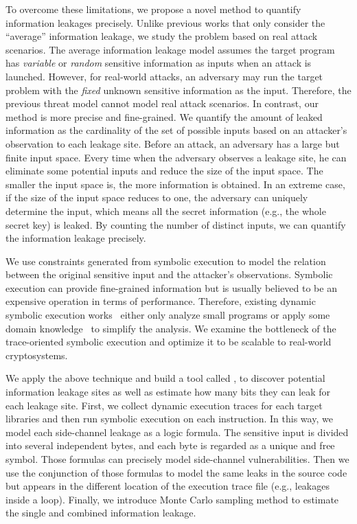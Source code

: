 To overcome these limitations, we propose a novel method to quantify information
leakages precisely. Unlike previous works that only consider the
``average'' information leakage, we study the problem based on real attack
scenarios. The average information leakage model assumes the target program has
\emph{variable} or \emph{random} sensitive information as inputs when an attack is
launched. However, for real-world attacks, an adversary may run the target
problem with the \emph{fixed} unknown sensitive information
as the input. Therefore, the previous threat model cannot model real attack
scenarios. In contrast, our method is more precise and fine-grained. 
We quantify
the amount of leaked information as the cardinality of the set of possible
inputs based on an attacker's observation to each leakage site.
Before an attack, an adversary has a large but finite input space. Every time
when the adversary observes a leakage site, he can eliminate some potential
inputs and reduce the size of the input space. The smaller the input space is,
the more information is obtained. In an extreme case, if the size of the
input space reduces to one, the adversary can uniquely determine the input, 
which means all the secret information (e.g., the whole secret key) is
leaked. By counting the number of distinct inputs, we can quantify the
information leakage precisely.

We use constraints generated from symbolic execution to model the relation 
between the original sensitive input
and the attacker's observations. Symbolic execution can
provide fine-grained information but is usually believed to be an expensive
operation in terms of performance. Therefore, existing dynamic symbolic
execution works~\cite{203878,236338,Brotzman19Casym} either only analyze
small programs or apply some domain knowledge~\cite{203878} to simplify the analysis. We
examine the bottleneck of the trace-oriented symbolic execution and optimize it
to be scalable to real-world cryptosystems.

We apply the above technique and build a tool called \tool{}, 
to discover potential information leakage sites as well as estimate how
many bits they can leak for each leakage site. 
First, we collect dynamic execution traces for each target
libraries and then run symbolic execution on each instruction. In this way, we model
each side-channel leakage as a logic formula. The sensitive input is divided into
several independent bytes, and each byte is regarded as a unique and free symbol. Those
formulas can precisely model side-channel vulnerabilities. Then we use the conjunction
of those formulas to model the same leaks in the source code but appears in the different location of
the execution trace file (e.g., leakages inside a loop).
Finally, we introduce Monte Carlo
sampling method to estimate the single and combined information leakage. 


